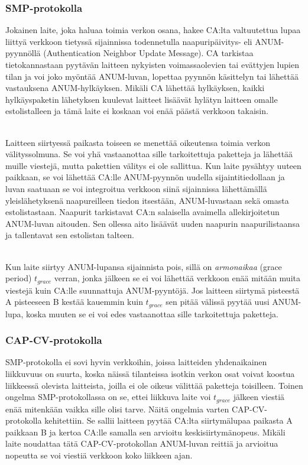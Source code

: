 \documentclass[finnish]{tktltiki2}
\theoremstyle{definition}
\theoremstyle{remark}
\begin{document}
\subsubsection{SMP-protokolla}

Jokainen laite, joka haluaa toimia verkon osana, hakee CA:lta valtuutettua lupaa liittyä verkkoon tietyssä sijainnissa todennetulla naapuripäivitys- eli ANUM-pyynnöllä (Authentication Neighbor Update Message). CA tarkistaa tietokannastaan pyytävän laitteen nykyisten voimassaolevien tai evättyjen lupien tilan ja voi joko myöntää ANUM-luvan, lopettaa pyynnön käsittelyn tai lähettää vastauksena ANUM-hylkäyksen. Mikäli CA lähettää hylkäyksen, kaikki hylkäyspaketin lähetyksen kuulevat laitteet lisäävät hylätyn laitteen omalle estolistalleen ja tämä laite ei koskaan voi enää päästä verkkoon takaisin.

\noindent\\
Laitteen siirtyessä paikasta toiseen se menettää oikeutensa toimia verkon välityssolmuna. Se voi yhä vastaanottaa sille tarkoitettuja paketteja ja lähettää muille viestejä, mutta pakettien välitys ei ole sallittua. Kun laite pysähtyy uuteen paikkaan, se voi lähettää CA:lle ANUM-pyynnön uudella sijaintitiedollaan ja luvan saatuaan se voi integroitua verkkoon siinä sijainnissa lähettämällä yleislähetyksenä naapureilleen tiedon itsestään, ANUM-luvastaan sekä omasta estolistastaan. Naapurit tarkistavat CA:n salaisella avaimella allekirjoitetun ANUM-luvan aitouden. Sen ollessa aito lisäävät uuden naapurin naapurilistaansa ja tallentavat sen estolistan talteen.

\noindent\\
Kun laite siirtyy ANUM-lupansa sijainnista pois, sillä on \emph{armonaikaa} (grace period) $t_{grace}$ verran, jonka jälkeen se ei voi lähettää verkkoon enää mitään muita viestejä kuin CA:lle suunnattuja ANUM-pyyntöjä. Jos laitteen siirtymä pisteestä A pisteeseen B kestää kauemmin kuin $t_{grace}$ sen pitää välissä pyytää uusi ANUM-lupa, koska muuten se ei voi edes vastaanottaa sille tarkoitettuja paketteja.

\subsubsection{CAP-CV-protokolla}

SMP-protokolla ei sovi hyvin verkkoihin, joissa laitteiden yhdenaikainen liikkuvuus on suurta, koska näissä tilanteissa isotkin verkon osat voivat koostua liikkeessä olevista laitteista, joilla ei ole oikeus välittää paketteja toisilleen. Toinen ongelma SMP-protokollassa on se, ettei liikkuva laite voi $t_{grace}$ jälkeen viestiä enää mitenkään vaikka sille olisi tarve. Näitä ongelmia varten CAP-CV-protokolla kehitettiin. Se sallii laitteen pyytää CA:lta siirtymälupaa paikasta A paikkaan B ja kertoa CA:lle samalla sen arvioitu keskisiirtymänopeus. Mikäli laite noudattaa tätä CAP-CV-protokollan ANUM-luvan reittiä ja arvioitua nopeutta se voi viestiä verkkoon koko liikkeen ajan.
\end{document}
